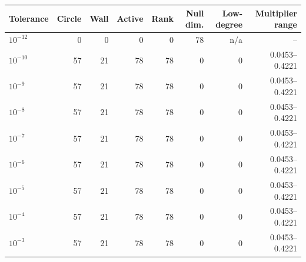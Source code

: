 \begin{tabular}{lrrrrrrr}
\toprule
Tolerance & Circle & Wall & Active & Rank & Null dim. & Low-degree & Multiplier range \\
\midrule
$10^{-12}$ & 0 & 0 & 0 & 0 & 78 & n/a & -- \\
$10^{-10}$ & 57 & 21 & 78 & 78 & 0 & 0 & 0.0453--0.4221 \\
$10^{-9}$ & 57 & 21 & 78 & 78 & 0 & 0 & 0.0453--0.4221 \\
$10^{-8}$ & 57 & 21 & 78 & 78 & 0 & 0 & 0.0453--0.4221 \\
$10^{-7}$ & 57 & 21 & 78 & 78 & 0 & 0 & 0.0453--0.4221 \\
$10^{-6}$ & 57 & 21 & 78 & 78 & 0 & 0 & 0.0453--0.4221 \\
$10^{-5}$ & 57 & 21 & 78 & 78 & 0 & 0 & 0.0453--0.4221 \\
$10^{-4}$ & 57 & 21 & 78 & 78 & 0 & 0 & 0.0453--0.4221 \\
$10^{-3}$ & 57 & 21 & 78 & 78 & 0 & 0 & 0.0453--0.4221 \\
\bottomrule
\end{tabular}
